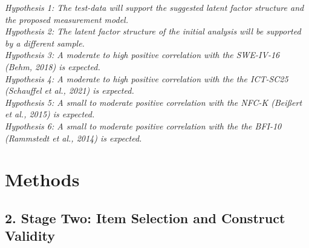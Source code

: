 \documentclass[
  12pt,
  a4paper,
  twoside]{article}
\begin{document}
\emph{Hypothesis 1: The test-data will support the suggested latent
factor structure and the proposed measurement model.}\\
\emph{Hypothesis 2: The latent factor structure of the initial analysis
will be supported by a different sample.}\\
\emph{Hypothesis 3: A moderate to high positive correlation with the
SWE-IV-16 (Behm, 2018) is expected.}\\
\emph{Hypothesis 4: A moderate to high positive correlation with the the
ICT-SC25 (Schauffel et al., 2021) is expected.}\\
\emph{Hypothesis 5: A small to moderate positive correlation with the
NFC-K (Beißert et al., 2015) is expected.}\\
\emph{Hypothesis 6: A small to moderate positive correlation with the
the BFI-10 (Rammstedt et al., 2014) is expected.}

\section{Methods}\label{methods}

\subsection{2. Stage Two: Item Selection and Construct
Validity}\label{stage-two-item-selection-and-construct-validity}
\end{document}
